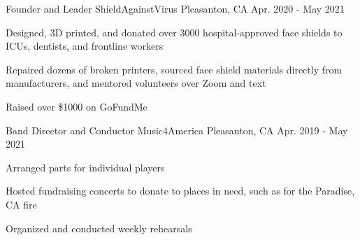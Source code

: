 


\begin{cventries}

\cventry
{Founder and Leader} %
{ShieldAgainstVirus} %
{Pleasanton, CA} %
{Apr. 2020 - May 2021} %
{ %
\begin{cvitems}
\item {Designed, 3D printed, and donated over 3000 hospital-approved face shields to ICUs, dentists, and frontline workers}
\item {Repaired dozens of broken printers, sourced face shield materials directly from\\ manufacturers, and mentored volunteers over Zoom and text}
\item {Raised over \$1000 on GoFundMe}
\end{cvitems}
}

\cventry
{Band Director and Conductor} %
{Music4America} %
{Pleasanton, CA} %
{Apr. 2019 - May 2021} %
{ %
\begin{cvitems}
\item {Arranged parts for individual players}
\item {Hosted fundraising concerts to donate to places in need, such as for the Paradise, CA fire}
\item {Organized and conducted weekly rehearsals}
\end{cvitems}
}




\end{cventries}
